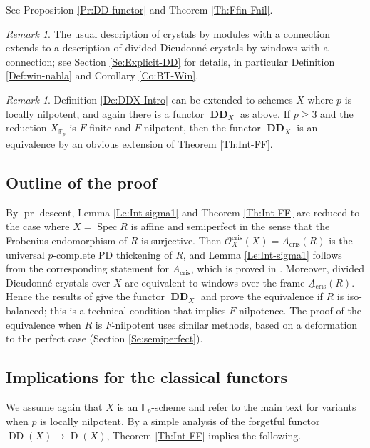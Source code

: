 \documentclass[a4paper,11pt]{article}
\theoremstyle{plain}
\theoremstyle{definition}
\theoremstyle{remark}
\newtheorem{Remark}[Lemma]{Remark}
\theoremstyle{definition}
\numberwithin{Lemma}{section}
\numberwithin{Subpoint}{Lemma}
\numberwithin{equation}{section}
\newcommand{\OOO}{\mathcal{O}}
\newcommand{\DD}{{\mathbb{D}}}
\newcommand{\FF}{{\mathbb{F}}}
\DeclareMathOperator{\Dcat}{D}
\DeclareMathOperator{\DDcat}{DD}
\DeclareMathOperator{\DDfun}{\mathbf {DD}} %
\DeclareMathOperator{\Spec}{Spec}
\DeclareMathOperator{\cris}{cris}
\newcommand{\nameoftop}{{\operatorname{pr}}}
\renewcommand{\u}{\underline}
\newcommand{\chang}[1]{{#1}}
\begin{document}
See Proposition \ref{Pr:DD-functor} and Theorem \ref{Th:Ffin-Fnil}.

\begin{Remark}
The usual description of crystals by modules with a connection
extends to a description of divided Dieudonn\'e crystals by
windows with a connection; 
see Section \ref{Se:Explicit-DD} for details,
in particular Definition \ref{Def:win-nabla} and Corollary \ref{Co:BT-Win}.
\end{Remark}

\begin{Remark}
Definition \ref{De:DDX-Intro} can be extended to schemes $X$ where $p$ is locally nilpotent,
and again there is a functor $\DDfun_X$ as above.
If $p\ge 3$ and the reduction
$X_{\FF_p}$ is $F$-finite and $F$-nilpotent,
then the functor $\DDfun_X$ is an equivalence 
by an obvious extension of Theorem \ref{Th:Int-FF}.
\end{Remark}

\subsection*{Outline of the proof}

By $\nameoftop$-descent, 
Lemma \ref{Le:Int-sigma1} and Theorem \ref{Th:Int-FF}
are reduced to the case where $X=\Spec R$ is affine and semiperfect
in the sense that the Frobenius endomorphism of $R$ is surjective.
Then $\OOO_X^{\cris}(X)=A_{\cris}(R)$ 
is the universal \chang{$p$-complete} PD thickening of $R$,
and Lemma \ref{Le:Int-sigma1} follows from 
the corresponding statement for $A_{\cris}$, 
which is proved in \cite{Scholze-Weinstein}.
Moreover, divided Dieudonn\'e crystals over $X$ are equivalent to 
windows over the frame $\u A{}_{\cris}(R)$.
Hence the results of \cite{Lau:Semiperfect} give the functor $\DDfun_X$ 
and prove the equivalence if $R$ is iso-balanced;
this is a technical condition that implies $F$-nilpotence.
The proof of the equivalence when $R$ is $F$-nilpotent 
uses similar methods, based on a deformation to the perfect case
(Section \ref{Se:semiperfect}).

\subsection*{Implications for the classical functors}

We assume again that $X$ is 
\chang{an $\FF_p$-scheme} and
refer to the main text for variants when $p$ is locally nilpotent. By a simple analysis of the forgetful functor $\DDcat(X)\to\Dcat(X)$, Theorem \ref{Th:Int-FF} implies the following.
\end{document}
